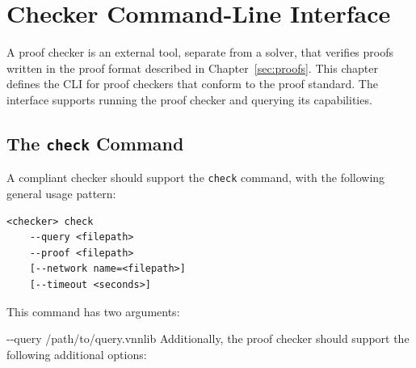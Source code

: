 \chapter{Checker Command-Line Interface}
\label{sec:checker-interface}

A proof checker is an external tool, separate from a solver, that verifies proofs written in the \vnnlib{} proof format described in Chapter~\ref{sec:proofs}.  This chapter defines the CLI for proof checkers that conform to the \vnnlib{} proof standard. The interface supports running the proof checker and querying its capabilities.

\section{The \texttt{check} Command}

A compliant checker should support the \texttt{check} command, with the following general usage pattern:
\begin{lstlisting}[style=bash]
<checker> check 
	--query <filepath>
	--proof <filepath> 
	[--network name=<filepath>]
	[--timeout <seconds>]
\end{lstlisting}
This command has two arguments:



{-{}-query /path/to/query.vnnlib}
Additionally, the proof checker should support the following additional options:


